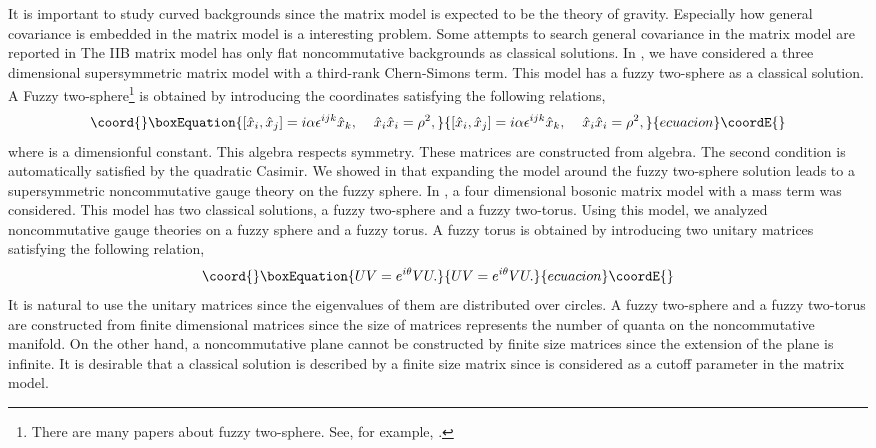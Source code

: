 \documentclass[a4paper,11pt]{article}
\begin{document}
It is important to study curved backgrounds 
since the matrix model is expected to be the theory of gravity. 
Especially how general covariance is embedded in the 
matrix model is a interesting problem. 
Some attempts to search general covariance in the matrix model 
are reported in \cite{IK,AIKO,azumakawai}
The IIB matrix model has only flat noncommutative  
backgrounds as classical solutions. 
In \cite{IKTW}, 
we have considered 
a three dimensional supersymmetric matrix model with 
a third-rank Chern-Simons term.  
This model has a fuzzy two-sphere as a classical solution. 
A Fuzzy two-sphere\footnote{
There are many papers about fuzzy two-sphere. 
See, for example, \cite{madore}.} 
is obtained by introducing the coordinates 
satisfying the following relations, 
\begin{equation}\coord{}\boxEquation{
[\hat{x}_{i},\hat{x}_{j}]=i\alpha\epsilon^{ijk}\hat{x}_{k}, 
\hspace{0.4cm}\hat{x}_{i}\hat{x}_{i}=\rho^{2}, 
\label{fuzzytwosphere}
}{
[\hat{x}_{i},\hat{x}_{j}]=i\alpha\epsilon^{ijk}\hat{x}_{k}, 
\hspace{0.4cm}\hat{x}_{i}\hat{x}_{i}=\rho^{2}, 
}{ecuacion}\coordE{}\end{equation}
where \myHighlight{$\alpha$}\coordHE{} is a dimensionful constant. 
This algebra respects \coordHE{} symmetry. 
These matrices are constructed from \coordHE{} algebra. 
The second condition is automatically satisfied 
by the quadratic Casimir. 
We showed in \cite{IKTW} that expanding the model around 
the fuzzy two-sphere solution leads to a 
supersymmetric noncommutative 
gauge theory on the fuzzy sphere. 
In \cite{yk2}, a four dimensional 
bosonic matrix model with a mass term  
was considered. 
This model has two classical solutions, a fuzzy two-sphere and 
a fuzzy two-torus. 
Using this model, we analyzed noncommutative 
gauge theories on a fuzzy sphere and a fuzzy torus. 
A fuzzy torus is obtained by introducing two 
unitary matrices 
satisfying the following relation, 
\begin{equation}\coord{}\boxEquation{
UV=e^{i\theta}VU.  
}{
UV=e^{i\theta}VU.  
}{ecuacion}\coordE{}\end{equation}
It is natural to use the unitary matrices since 
the eigenvalues of them are distributed over circles. 
A fuzzy two-sphere and a fuzzy two-torus are constructed 
from finite dimensional matrices since the size of matrices 
represents the number of quanta on the noncommutative manifold. 
On the other hand, a noncommutative plane cannot be constructed 
by finite size matrices since 
the extension of the plane is infinite. 
It is desirable that a classical solution 
is described by a finite size matrix since \coordHE{} is considered as 
a cutoff parameter in the matrix model. 
\end{document}
